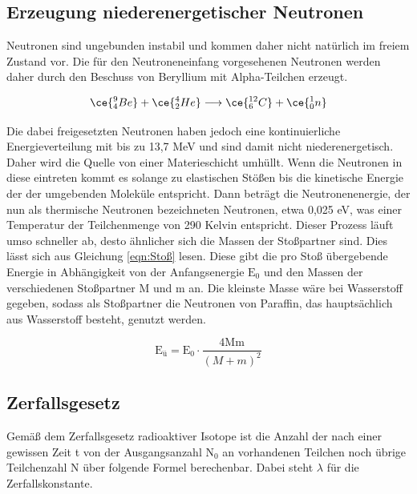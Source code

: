     
    \subsection{Erzeugung niederenergetischer Neutronen}
        Neutronen sind ungebunden instabil und kommen daher nicht natürlich im freiem Zustand vor. Die für den Neutroneneinfang vorgesehenen Neutronen werden daher durch den Beschuss von 
        Beryllium mit Alpha-Teilchen erzeugt.

        \begin{equation*}
            \ce{^{9}_{4}Be} + \ce{^{4}_{2}He} \longrightarrow \ce{^{12}_{6}C} + \ce{^{1}_{0}n}
        \end{equation*}

        \noindent
        Die dabei freigesetzten Neutronen haben jedoch eine kontinuierliche Energieverteilung mit bis zu 13,7 MeV und sind damit nicht niederenergetisch. Daher wird die Quelle von einer 
        Materieschicht umhüllt. Wenn die Neutronen in diese eintreten kommt es solange zu elastischen Stößen bis die kinetische Energie der der umgebenden Moleküle entspricht. Dann beträgt
        die Neutronenenergie, der nun als thermische Neutronen bezeichneten Neutronen, etwa 0,025 eV, was einer Temperatur der Teilchenmenge von 290 Kelvin entspricht. Dieser Prozess läuft 
        umso schneller ab, desto ähnlicher sich die Massen der Stoßpartner sind. Dies lässt sich aus Gleichung \ref{eqn:Stoß} lesen. Diese gibt die pro Stoß übergebende Energie in Abhängigkeit
        von der Anfangsenergie $\text{E}_0$ und den Massen der verschiedenen Stoßpartner M und m an. Die kleinste Masse wäre bei Wasserstoff gegeben, sodass als Stoßpartner die Neutronen von
        Paraffin, das hauptsächlich aus Wasserstoff besteht, genutzt werden. 

        \begin{equation}
            \text{E}_{\text{ü}} = \text{E}_0 \cdot \frac{4\text{Mm}}{\left(M + m\right)^2}
            \label{eqn:Stoß}
        \end{equation}

    \subsection{Zerfallsgesetz}
        Gemäß dem Zerfallsgesetz radioaktiver Isotope ist die Anzahl der nach einer gewissen Zeit t von der Ausgangsanzahl $\text{N}_0$ an vorhandenen Teilchen noch übrige Teilchenzahl N
        über folgende Formel berechenbar. Dabei steht $\lambda$ für die Zerfallskonstante.
        
